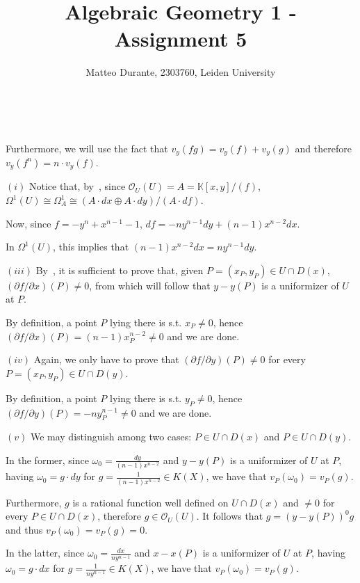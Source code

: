 \documentclass{article}
\newcommand{\numberset}{\mathbb}
\newcommand{\K}{\numberset{K}}
\newcommand{\exercise}[1]{\noindent {\bf Exercise #1}}
\begin{document}
\title{Algebraic Geometry 1 - Assignment 5}

\author{Matteo Durante, 2303760, Leiden University}

\maketitle


~\\
\exercise{7.9.12}

Furthermore, we will use the fact that $v_y(fg)=v_y(f)+v_y(g)$ and therefore $v_y(f^n)=n\cdot v_y(f)$.

$(i)$ Notice that, by~\cite[ex. 7.3.6]{edix}, since $\mathcal{O}_U(U)=A=\K[x,y]/(f)$, $\Omega^1(U)\cong\Omega^1_A\cong(A\cdot dx\oplus A\cdot dy)/(A\cdot df)$.

Now, since $f=-y^n+x^{n-1}-1$, $df=-ny^{n-1}dy+(n-1)x^{n-2}dx$.

In $\Omega^1(U)$, this implies that $(n-1)x^{n-2}dx=ny^{n-1}dy$.

$(iii)$ By~\cite[ex. 7.9.10]{edix}, it is sufficient to prove that, given $P=(x_P,y_P)\in U\cap D(x)$, $(\partial f/\partial x)(P)\neq 0$, from which will follow that $y-y(P)$ is a uniformizer of $U$ at $P$.

By definition, a point $P$ lying there is s.t. $x_P\neq 0$, hence $(\partial f/\partial x)(P)=(n-1)x^{n-2}_P\neq 0$ and we are done.

$(iv)$ Again, we only have to prove that $(\partial f/\partial y)(P)\neq 0$ for every $P=(x_P,y_P)\in U\cap D(y)$.

By definition, a point $P$ lying there is s.t. $y_P\neq 0$, hence $(\partial f/\partial y)(P)=-ny^{n-1}_P\neq 0$ and we are done.

$(v)$ We may distinguish among two cases: $P\in U\cap D(x)$ and $P\in U\cap D(y)$.

In the former, since $\omega_0=\frac{dy}{(n-1)x^{n-2}}$ and $y-y(P)$ is a uniformizer of $U$ at $P$, having $\omega_0=g\cdot dy$ for $g=\frac{1}{(n-1)x^{n-2}}\in K(X)$, we have that $v_P(\omega_0)=v_P(g)$.

Furthermore, $g$ is a rational function well defined on $U\cap D(x)$ and $\neq 0$ for every $P\in U\cap D(x)$, therefore $g\in\mathcal{O}_U(U)$. It follows that $g=(y-y(P))^0g$ and thus $v_P(\omega_0)=v_P(g)=0$.

In the latter, since $\omega_0=\frac{dx}{ny^{n-1}}$ and $x-x(P)$ is a uniformizer of $U$ at $P$, having $\omega_0=g\cdot dx$ for $g=\frac{1}{ny^{n-1}}\in K(X)$, we have that $v_P(\omega_0)=v_P(g)$.
\end{document}
